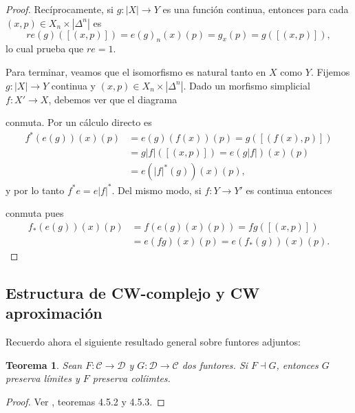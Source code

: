 \documentclass[11pt]{report}
\theoremstyle{colored}
\newtheorem{theorem}{Teorema}[section]
\newcommand{\cat}[1]{\mathsf{#1}}
\renewcommand{\ss}[1]{\Delta^{#1}}
\begin{document}
\begin{proof}
Recíprocamente, si $g : |X| \to Y$ es una función continua, entonces para cada $(x,p) \in X_n \times |\ss{n}|$ es
\[
r e(g)([(x,p)]) = e(g)_n(x)(p) = g_x(p) = g([(x,p)]),
\]
lo cual prueba que $r e  = 1$.

Para terminar, veamos que el isomorfismo es natural tanto en $X$ como $Y$. Fijemos $g : |X| \to Y$ continua y $(x,p) \in X_n \times |\ss{n}|$. Dado un morfismo simplicial $f : X' \to X$, debemos ver que el diagrama
\begin{center}
\end{center}
conmuta. Por un cálculo directo es
\begin{align*}
f^*(e(g))(x)(p) &= e(g)(f(x))(p) = g([(f(x),p)])\\
& = g|f|([(x,p)]) = e(g|f|)(x)(p)\\
& = e(|f|^*(g))(x)(p),
\end{align*}
y por lo tanto $f^*e = e|f|^*$. Del mismo modo, si $f : Y \to Y'$ es continua entonces
\begin{center}
\end{center}
conmuta pues
\begin{align*}
f_*(e(g))(x)(p) &= f(e(g)(x)(p)) = fg([(x,p)])\\
&= e(fg)(x)(p) = e(f_*(g))(x)(p).
\end{align*}
\end{proof}

\subsection{Estructura de CW-complejo y CW aproximación}

Recuerdo ahora el siguiente resultado general sobre funtores adjuntos:

\begin{theorem} \label{rapl-lapc}Sean $F : \mathscr{C} \to \mathscr{D}$ y $G : \mathscr{D} \to \mathscr{C}$ dos funtores. Si $F \dashv G$, entonces $G$ preserva límites y $F$ preserva colíimtes. 
\end{theorem}
\begin{proof} Ver \cite{ct-context}, teoremas 4.5.2 y 4.5.3.
\end{proof}
\end{document}

